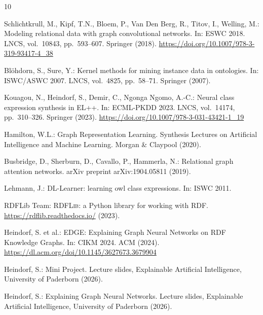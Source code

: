 \documentclass[runningheads]{llncs}
\begin{document}
{}
\begin{thebibliography}{10}

Schlichtkrull, M., Kipf, T.N., Bloem, P., Van Den Berg, R., Titov, I., Welling, M.:
Modeling relational data with graph convolutional networks.
In: ESWC 2018. LNCS, vol.~10843, pp.~593--607. Springer (2018).
\url{https://doi.org/10.1007/978-3-319-93417-4_38}

Bl{\"o}hdorn, S., Sure, Y.:
Kernel methods for mining instance data in ontologies.
In: ISWC/ASWC 2007. LNCS, vol.~4825, pp.~58--71. Springer (2007).

Kouagou, N., Heindorf, S., Demir, C., Ngonga Ngomo, A.-C.:
Neural class expression synthesis in \textsc{EL++}.
In: ECML-PKDD 2023. LNCS, vol.~14174, pp.~310--326. Springer (2023).
\url{https://doi.org/10.1007/978-3-031-43421-1_19}

Hamilton, W.L.:
Graph Representation Learning.
Synthesis Lectures on Artificial Intelligence and Machine Learning.
Morgan \& Claypool (2020).

Busbridge, D., Sherburn, D., Cavallo, P., Hammerla, N.:
Relational graph attention networks.
arXiv preprint arXiv:1904.05811 (2019).

Lehmann, J.:
DL-Learner: learning owl class expressions. In: ISWC 2011.

RDFLib Team:
\textsc{RDFLib}: a Python library for working with RDF.
\url{https://rdflib.readthedocs.io/} (2023).

Heindorf, S. et al.:
\textsc{EDGE}: Explaining Graph Neural Networks on RDF Knowledge Graphs.
In: CIKM 2024. ACM (2024).
\url{https://dl.acm.org/doi/10.1145/3627673.3679904}

Heindorf, S.:
Mini Project.
Lecture slides, Explainable Artificial Intelligence, University of Paderborn (2026).

Heindorf, S.:
Explaining Graph Neural Networks.
Lecture slides, Explainable Artificial Intelligence, University of Paderborn (2026).

\end{thebibliography}
\end{document}

